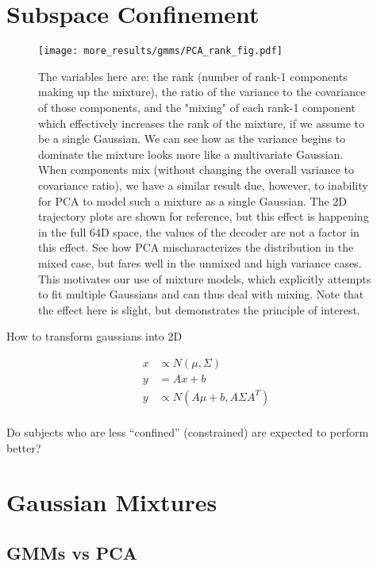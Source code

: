 \documentclass[../main.tex]{subfiles}
\begin{document}
\section{Subspace Confinement}

\begin{figure}[H]
  \centering
    \texttt{[image: more\_results/gmms/PCA\_rank\_fig.pdf]}
    \caption[Explanatory Mixture Model]{The variables here are: the rank (number of rank-1 components making up the mixture), the ratio of the variance to the covariance of those components, and the "mixing" of each rank-1 component which effectively increases the rank of the mixture, if we assume to be a single Gaussian. We can see how as the variance begins to dominate the mixture looks more like a multivariate Gaussian. When components mix (without changing the overall variance to covariance ratio), we have a similar result due, however, to inability for PCA to model such a mixture as a single Gaussian. The 2D trajectory plots are shown for reference, but this effect is happening in the full 64D space, the values of the decoder are not a factor in this effect. See how PCA mischaracterizes the distribution in the mixed case, but fares well in the unmixed and high variance cases. This motivates our use of mixture models, which explicitly attempts to fit multiple Gaussians and can thus deal with mixing. Note that the effect here is slight, but demonstrates the principle of interest.}\label{fig:toy_model}
\end{figure}
  
How to transform gaussians into 2D
  
\begin{align}
    x &\propto N(\mu, \Sigma) \\ 
    y &= Ax + b \\ 
  y &\propto N(A\mu + b, A\Sigma A^T) \\ 
\end{align}

Do subjects who are less “confined” (constrained) are expected to perform better?



\section{Gaussian Mixtures}


\subsection{GMMs vs PCA}
\end{document}

